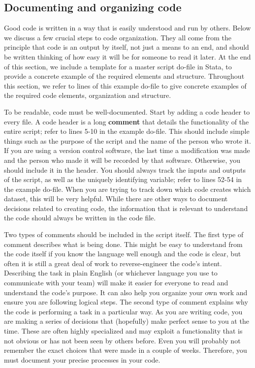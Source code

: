 \subsection{Documenting and organizing code}
Good code is written in a way that is easily understood and run by others.
Below we discuss a few crucial steps to code organization.
They all come from the principle that code is an output by itself,
not just a means to an end,
and should be written thinking of how easy it will be for someone to read it later.
At the end of this section, we include a template for a master script do-file in Stata,
to provide a concrete example of the required elements and structure.
Throughout this section, we refer to lines of this example do-file
to give concrete examples of the required code elements, organization and structure.

To be readable, code must be well-documented.
Start by adding a code header to every file.
A code header is a long \textbf{comment}
that details the functionality of the entire script;
refer to lines 5-10 in the example do-file.
This should include simple things such as
the purpose of the script and the name of the person who wrote it.
If you are using a version control software,
the last time a modification was made and the person who made it will be recorded by that software.
Otherwise, you should include it in the header.
You should always track the inputs and outputs of the script,
as well as the uniquely identifying variable;
refer to lines 52-54 in the example do-file.
When you are trying to track down which code creates which dataset, this will be very helpful.
While there are other ways to document decisions related to creating code,
the information that is relevant to understand the code should always be written in the code file.

Two types of comments should be included in the script itself.
The first type of comment describes what is being done.
This might be easy to understand from the code itself
if you know the language well enough and the code is clear,
but often it is still a great deal of work to reverse-engineer the code's intent.
Describing the task in plain English (or whichever language you use to communicate with your team)
will make it easier for everyone to read and understand the code's purpose.
It can also help you organize your own work and ensure you are following logical steps.
The second type of comment explains why the code is performing a task in a particular way.
As you are writing code, you are making a series of decisions that
(hopefully) make perfect sense to you at the time.
These are often highly specialized and may exploit a functionality
that is not obvious or has not been seen by others before.
Even you will probably not remember the exact choices that were made in a couple of weeks.
Therefore, you must document your precise processes in your code.

